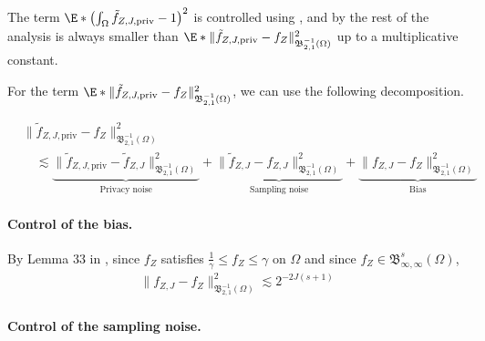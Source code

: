 \documentclass{article}
\newcommand{\1}{\mathds{1}}
\DeclarePairedDelimiter{\paren}{\lparen}{\rparen}
\theoremstyle{plain}
\theoremstyle{definition}
\theoremstyle{remark}
\begin{document}
The term $\E*{ \paren*{\int_{\Omega} \tilde{f}_{Z, J, \textrm{priv} } - 1}^2}$ is controlled using , and by the rest of the analysis is always smaller than $\E*{ \|\tilde{f}_{Z, J, \textrm{priv} } -  f_Z \|_{{\mathfrak{B}}_{2, 1}^{-1}(\Omega)}^2}$ up to a multiplicative constant.

For the term $\E*{ \|\tilde{f}_{Z, J, \textrm{priv} } -  f_Z \|_{{\mathfrak{B}}_{2, 1}^{-1}(\Omega)}^2}$, we can use the following decomposition.

\begin{equation}
    \begin{aligned}
        &\| \tilde{f}_{Z,J, \textrm{priv}} - f_Z\|_{{\mathfrak{B}}_{2, 1}^{-1}(\Omega)}^2 \\
        &\quad\lesssim 
        \underbrace{\| \tilde{f}_{Z,J, \textrm{priv}} - \tilde{f}_{Z,J}\|_{{\mathfrak{B}}_{2, 1}^{-1}(\Omega)}^2 }_{\text{Privacy noise}}
        + 
        \underbrace{\| \tilde{f}_{Z,J} - f_{Z,J}\|_{{\mathfrak{B}}_{2, 1}^{-1}(\Omega)}^2}_{\text{Sampling noise}}
        + 
        \underbrace{\| {f}_{Z,J} - f_{Z}\|_{{\mathfrak{B}}_{2, 1}^{-1}(\Omega)}^2}_{\text{Bias}}
    \end{aligned}
\end{equation}

\paragraph{Control of the bias.}

By Lemma 33 in \cite{Manole2024Plugin}, since $f_{Z}$ satisfies $\frac{1}{\gamma} \leq f_Z \leq \gamma$ on $\Omega$ and since $f_Z \in {{\mathfrak{B}}_{\infty, \infty}^{s}(\Omega)}$,
\begin{equation}
    \begin{aligned}
        \| {f}_{Z,J} - f_{Z}\|_{{\mathfrak{B}}_{2, 1}^{-1}(\Omega)}^2 
        \lesssim
        2^{-2J(s+1)}
    \end{aligned}
\end{equation}

\paragraph{Control of the sampling noise.}
\end{document}
